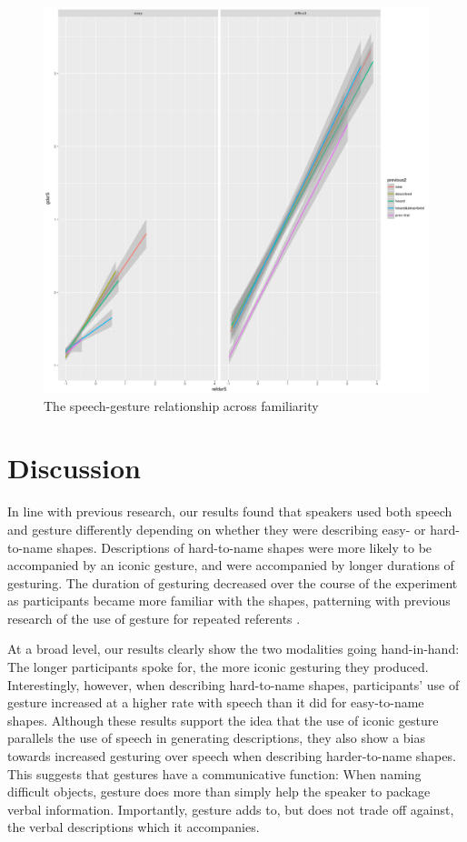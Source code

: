 \documentclass[a4paper,man,natbib]{apa6}
\begin{document}
\begin{figure}
  \centering
	\includegraphics[width=\linewidth]{prev_plot.png}
  \caption{The speech-gesture relationship across familiarity}
  \label{fig:prev}
\end{figure}


\section{Discussion}
In line with previous research, our results found that speakers used both speech and gesture differently depending on whether they were describing easy- or hard-to-name shapes. 
Descriptions of hard-to-name shapes were more likely to be accompanied by an iconic gesture, and were accompanied by longer durations of gesturing. 
The duration of gesturing decreased over the course of the experiment as participants became more familiar with the shapes, patterning with previous research of the use of gesture for repeated referents \citep{Hoetjes2015}.

At a broad level, our results clearly show the two modalities going hand-in-hand: The longer participants spoke for, the more iconic gesturing they produced.
Interestingly, however, when describing hard-to-name shapes, participants' use of gesture increased at a higher rate with speech than it did for easy-to-name shapes.
Although these results support the idea that the use of iconic gesture parallels the use of speech in generating descriptions, they also show a bias towards increased gesturing over speech when describing harder-to-name shapes.
This suggests that gestures have a communicative function: When naming difficult objects, gesture does more than simply help the speaker to package verbal information.
Importantly, gesture adds to, but does not trade off against, the verbal descriptions which it accompanies.
\end{document}
